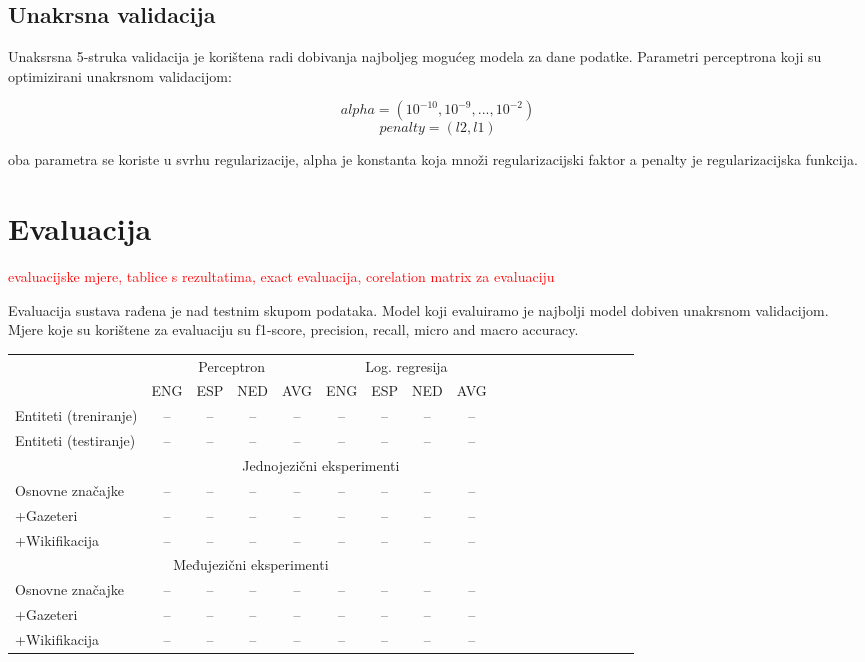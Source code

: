 \documentclass[times, utf8, seminar]{fer}
\newcommand\myworries[1]{\textcolor{red}{#1}}
\begin{document}
\section{Unakrsna validacija}
Unaksrsna 5-struka validacija je korištena radi dobivanja najboljeg mogućeg modela za dane podatke. Parametri perceptrona koji su optimizirani unakrsnom validacijom: 

\[ alpha = (10^{-10}, 10^{-9}, ..., 10^{-2}) \]
\[ penalty = (l2, l1) \]

oba parametra se koriste u svrhu regularizacije,  alpha je konstanta koja množi regularizacijski faktor a penalty je regularizacijska funkcija.
\chapter{Evaluacija}
\myworries{evaluacijske mjere, tablice s rezultatima, exact evaluacija, corelation matrix za evaluaciju}

Evaluacija sustava rađena je nad testnim skupom podataka. Model koji evaluiramo je najbolji model dobiven unakrsnom validacijom. Mjere koje su korištene za evaluaciju su f1-score, precision, recall, micro and macro accuracy.

\begin{center}
\begin{tabular}{ lcccccccc }
\hline
& \multicolumn{4}{c}{Perceptron} & \multicolumn{4}{c}{Log. regresija} \\ 
\cline{2-5}\cline{6-9}
 & ENG & ESP & NED & AVG & ENG & ESP & NED & AVG\\ 
\hline
Entiteti (treniranje) & -- & -- & -- & -- & -- & -- & -- & -- \\
Entiteti (testiranje) & -- & -- & -- & -- & -- & -- & -- & -- \\
\hline
\multicolumn{19}{c}{Jednojezični eksperimenti } \\
\hline
Osnovne značajke & -- & -- & -- & -- & -- & -- & -- & -- \\
+Gazeteri & -- & -- & -- & -- & -- & -- & -- & -- \\
+Wikifikacija & -- & -- & -- & -- & -- & -- & -- & -- \\
\hline
\multicolumn{9}{c}{Međujezični eksperimenti } \\
\hline
Osnovne značajke & -- & -- & -- & -- & -- & -- & -- & -- \\
+Gazeteri & -- & -- & -- & -- & -- & -- & -- & -- \\
+Wikifikacija & -- & -- & -- & -- & -- & -- & -- & -- \\
\hline
\end{tabular}
\end{center}
\end{document}
